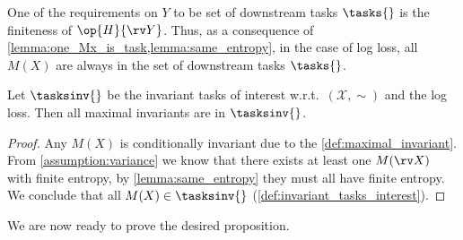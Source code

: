 \documentclass[final]{article}
\begin{document}
One of the requirements on $Y$ to be set of downstream tasks $\tasks{}$ is the finiteness of $\op{H}{\rv Y}$. Thus, as a consequence of \cref{lemma:one_Mx_is_task,lemma:same_entropy}, in the case of log loss, all $M(X)$ are always in the set of downstream tasks $\tasks{}$.


\begin{lemma}\label{lemma:all_Mx_is_task}
Let $\tasksinv{}$ be the invariant tasks of interest w.r.t.\  $(\mathcal{X},\sim)$ and the log loss.
Then all maximal invariants are in $\tasksinv{}$.
\end{lemma}
\begin{proof}
Any $M(X)$ is conditionally invariant due to the \cref{def:maximal_invariant}.
From \cref{assumption:variance} we know that there exists at least one $M(\rv X)$ with finite entropy, by \cref{lemma:same_entropy} they must all have finite entropy.
We conclude that all $M(X) \in \tasksinv{}$ (\cref{def:invariant_tasks_interest}).
\end{proof}



We are now ready to prove the desired proposition.
\end{document}
